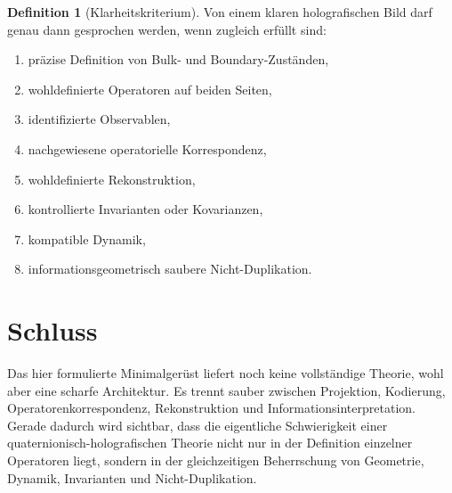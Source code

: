 \documentclass[11pt,a4paper]{article}
\theoremstyle{definition}
\newtheorem{definition}{Definition}
\theoremstyle{remark}
\begin{document}
\begin{definition}[Klarheitskriterium]
Von einem klaren holografischen Bild darf genau dann gesprochen werden, wenn zugleich erfüllt sind:
\begin{enumerate}[label=(\arabic*)]
    \item präzise Definition von Bulk- und Boundary-Zuständen,
    \item wohldefinierte Operatoren auf beiden Seiten,
    \item identifizierte Observablen,
    \item nachgewiesene operatorielle Korrespondenz,
    \item wohldefinierte Rekonstruktion,
    \item kontrollierte Invarianten oder Kovarianzen,
    \item kompatible Dynamik,
    \item informationsgeometrisch saubere Nicht-Duplikation.
\end{enumerate}
\end{definition}

\section{Schluss}
Das hier formulierte Minimalgerüst liefert noch keine vollständige Theorie, wohl aber eine scharfe Architektur. Es trennt sauber zwischen Projektion, Kodierung, Operatorenkorrespondenz, Rekonstruktion und Informationsinterpretation. Gerade dadurch wird sichtbar, dass die eigentliche Schwierigkeit einer quaternionisch-holografischen Theorie nicht nur in der Definition einzelner Operatoren liegt, sondern in der gleichzeitigen Beherrschung von Geometrie, Dynamik, Invarianten und Nicht-Duplikation.
\end{document}
